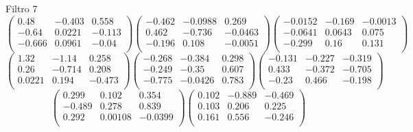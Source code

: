 Filtro 7
{ \small
\[
\begin{pmatrix}
  0.48 & -0.403 & 0.558 \\
  -0.64 & 0.0221 & -0.113 \\
  -0.666 & 0.0961 & -0.04 \\
\end{pmatrix}
\begin{pmatrix}
  -0.462 & -0.0988 & 0.269 \\
  0.462 & -0.736 & -0.0463 \\
  -0.196 & 0.108 & -0.0051 \\
\end{pmatrix}
\begin{pmatrix}
  -0.0152 & -0.169 & -0.0013 \\
  -0.0641 & 0.0643 & 0.075 \\
  -0.299 & 0.16 & 0.131 \\
\end{pmatrix}
\]
\[
\begin{pmatrix}
  1.32 & -1.14 & 0.258 \\
  0.26 & -0.714 & 0.208 \\
  0.0221 & 0.194 & -0.473 \\
\end{pmatrix}
\begin{pmatrix}
  -0.268 & -0.384 & 0.298 \\
  -0.249 & -0.35 & 0.607 \\
  -0.775 & -0.0426 & 0.783 \\
\end{pmatrix}
\begin{pmatrix}
  -0.131 & -0.227 & -0.319 \\
  0.433 & -0.372 & -0.705 \\
  -0.23 & 0.466 & -0.198 \\
\end{pmatrix}
\]
\[
\begin{pmatrix}
  0.299 & 0.102 & 0.354 \\
  -0.489 & 0.278 & 0.839 \\
  0.292 & 0.00108 & -0.0399 \\
\end{pmatrix}
\begin{pmatrix}
  0.102 & -0.889 & -0.469 \\
  0.103 & 0.206 & 0.225 \\
  0.161 & 0.556 & -0.246 \\
\end{pmatrix}
\]
}

